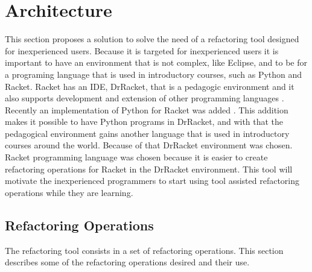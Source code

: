 
% 
% 

\section{Architecture}

This section proposes a solution to solve the need of a refactoring tool designed for inexperienced users.
Because it is targeted for inexperienced users it is important to have an environment that is not complex, like Eclipse, and to be for a programing language that is used in introductory courses, such as Python and Racket.
Racket has an IDE, DrRacket, that is a pedagogic environment \cite{drscheme_pegadogy} and it also supports development and extension of other programming languages \cite{tobin2011languages}. 
Recently  an implementation of Python for Racket was added \cite{ramos2014implementation}. 
This addition makes it possible to have Python programs in DrRacket, and with that the pedagogical environment gains another language that is used in introductory courses around the world. Because of that DrRacket environment was chosen. 
Racket programming language was chosen because it is easier to create refactoring operations for Racket in the DrRacket environment.
This tool will motivate the inexperienced programmers to start using tool assisted refactoring operations while they are learning.


\subsection{Refactoring Operations}
The refactoring tool consists in a set of refactoring operations.
This section describes some of the refactoring operations desired and their use.

